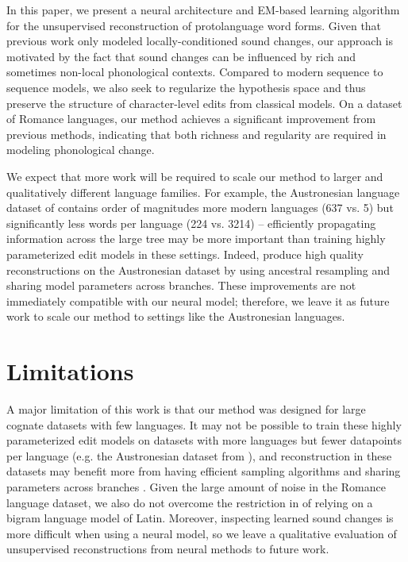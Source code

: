 \documentclass[11pt]{article}
\begin{document}
In this paper, we present a neural architecture and EM-based learning algorithm for the unsupervised reconstruction of protolanguage word forms. Given that previous work only modeled locally-conditioned sound changes, our approach is motivated by the fact that sound changes can be influenced by rich and sometimes non-local phonological contexts. Compared to modern sequence to sequence models, we also seek to regularize the hypothesis space and thus preserve the structure of character-level edits from classical models. 
On a dataset of Romance languages, our method achieves a significant improvement from previous methods, indicating that both richness and regularity are required in modeling phonological change.


We expect that more work will be required to scale our method to larger and qualitatively different language families. For example, the Austronesian language dataset of \citet{greenhill2008austronesian} contains order of magnitudes more modern languages (637 vs. 5) but significantly less words per language (224 vs. 3214) -- 
 efficiently propagating information across the large tree may be more important than training highly parameterized edit models in these settings. Indeed, \citet{bouchard-cote-etal-2009-improved, doi:10.1073/pnas.1204678110} produce high quality reconstructions on the Austronesian dataset by using ancestral resampling and sharing model parameters across branches. These improvements are not immediately compatible with our neural model; therefore, we leave it as future work to scale our method to settings like the Austronesian languages. 


\section*{Limitations}
A major limitation of this work is that our method was designed for large cognate datasets with few languages. It may not be possible to train these highly parameterized edit models on datasets with more languages but fewer datapoints per language (e.g. the Austronesian dataset from \citet{greenhill2008austronesian}), and reconstruction in these datasets may benefit more from having efficient sampling algorithms and sharing parameters across branches \citep{bouchard-cote-etal-2009-improved}. Given the large amount of noise in the Romance language dataset, we also do not overcome the restriction in \citet{bouchard-etal-2007-probabilistic} of relying on a bigram language model of Latin. Moreover, inspecting learned sound changes is more difficult when using a neural model, so we leave a qualitative evaluation of unsupervised reconstructions from neural methods to future work. 
\end{document}
